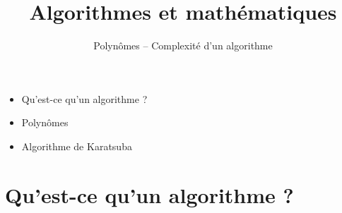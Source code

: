 



\newcommand{\Python}{\texttt{Python}}
\renewcommand{\evidence}[1]{{\color{blue}\textbf{#1}}}

\usepackage{textcomp}

\usepackage{listings}



\newcommand{\codeinline}[1]{\lstinline!#1!}







\title{{\bf Algorithmes et mathématiques}}
\subtitle{Polynômes -- Complexité d'un algorithme}

\begin{frame}
  
  \debutmontitre

  \pause

{\footnotesize
\hfill
{}
\begin{minipage}{0.6\textwidth}
  \begin{itemize}
    \item<3-> Qu'est-ce qu'un algorithme ?
    \item<4-> Polynômes
    \item<5-> Algorithme de Karatsuba
  \end{itemize}
\end{minipage}
}

\end{frame}

\setcounter{framenumber}{0}


\section{Qu'est-ce qu'un algorithme ?}

